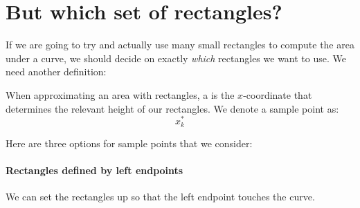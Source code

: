 \documentclass{ximera}
\begin{document}
\section{But which set of rectangles?}

If we are going to try and actually use many small rectangles to
compute the area under a curve, we should decide on exactly
\textit{which} rectangles we want to use. We need another definition:

\begin{definition}
  When approximating an area with rectangles, a  is
  the $x$-coordinate that determines the relevant height of our
  rectangles. We denote a sample point as:
  \[
  x_k^*
  \]
\end{definition}


Here are three options for sample points that we consider:

\paragraph{Rectangles defined by left endpoints}

We can set the rectangles up so that the left endpoint touches the
curve.

\begin{image}
\end{image}
\end{document}
